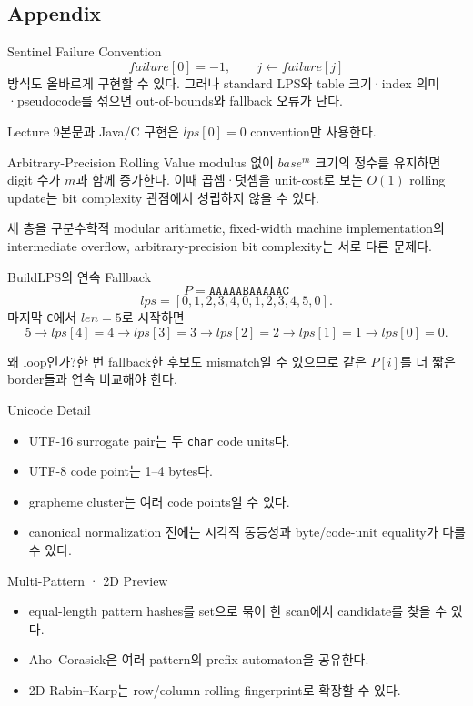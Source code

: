 \subsection{Appendix}
\begin{frame}{Sentinel Failure Convention}
\[
failure[0]=-1,\qquad j\gets failure[j]
\]
방식도 올바르게 구현할 수 있다. 그러나 standard LPS와 table 크기·index 의미·pseudocode를 섞으면 out-of-bounds와 fallback 오류가 난다.
\begin{block}{Lecture 9}본문과 Java/C 구현은 \(lps[0]=0\) convention만 사용한다.\end{block}
\end{frame}
\begin{frame}{Arbitrary-Precision Rolling Value}
modulus 없이 \(base^m\) 크기의 정수를 유지하면 digit 수가 \(m\)과 함께 증가한다. 이때 곱셈·덧셈을 unit-cost로 보는 \(O(1)\) rolling update는 bit complexity 관점에서 성립하지 않을 수 있다.
\begin{block}{세 층을 구분}수학적 modular arithmetic, fixed-width machine implementation의 intermediate overflow, arbitrary-precision bit complexity는 서로 다른 문제다.\end{block}
\end{frame}
\begin{frame}{BuildLPS의 연속 Fallback}
\[
P=\texttt{AAAAABAAAAAC}
\]
\[
lps=[0,1,2,3,4,0,1,2,3,4,5,0].
\]
마지막 \texttt{C}에서 \(len=5\)로 시작하면
\[
5\to lps[4]=4\to lps[3]=3\to lps[2]=2\to lps[1]=1\to lps[0]=0.
\]
\begin{block}{왜 loop인가?}한 번 fallback한 후보도 mismatch일 수 있으므로 같은 \(P[i]\)를 더 짧은 border들과 연속 비교해야 한다.\end{block}
\end{frame}
\begin{frame}{Unicode Detail}
\begin{itemize}\item UTF-16 surrogate pair는 두 \texttt{char} code units다.\item UTF-8 code point는 1--4 bytes다.\item grapheme cluster는 여러 code points일 수 있다.\item canonical normalization 전에는 시각적 동등성과 byte/code-unit equality가 다를 수 있다.\end{itemize}
\end{frame}
\begin{frame}{Multi-Pattern · 2D Preview}
\begin{itemize}\item equal-length pattern hashes를 set으로 묶어 한 scan에서 candidate를 찾을 수 있다.\item Aho--Corasick은 여러 pattern의 prefix automaton을 공유한다.\item 2D Rabin--Karp는 row/column rolling fingerprint로 확장할 수 있다.\end{itemize}
\end{frame}

